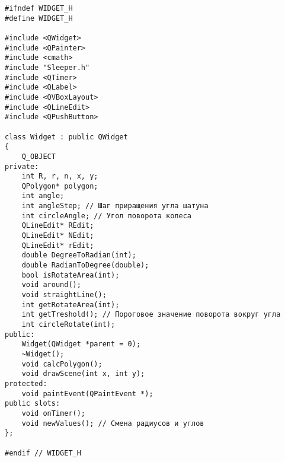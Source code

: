
\begin{lstlisting}[style=customoz, caption=widget.h]
#ifndef WIDGET_H
#define WIDGET_H

#include <QWidget>
#include <QPainter>
#include <cmath>
#include "Sleeper.h"
#include <QTimer>
#include <QLabel>
#include <QVBoxLayout>
#include <QLineEdit>
#include <QPushButton>

class Widget : public QWidget
{
    Q_OBJECT
private:
    int R, r, n, x, y;
    QPolygon* polygon;
    int angle;
    int angleStep; // Шаг приращения угла шатуна
    int circleAngle; // Угол поворота колеса
    QLineEdit* REdit;
    QLineEdit* NEdit;
    QLineEdit* rEdit;
    double DegreeToRadian(int);
    double RadianToDegree(double);
    bool isRotateArea(int);
    void around();
    void straightLine();
    int getRotateArea(int);
    int getTreshold(); // Пороговое значение поворота вокруг угла
    int circleRotate(int);
public:
    Widget(QWidget *parent = 0);
    ~Widget();
    void calcPolygon();
    void drawScene(int x, int y);
protected:
    void paintEvent(QPaintEvent *);
public slots:
    void onTimer();
    void newValues(); // Смена радиусов и углов
};

#endif // WIDGET_H
\end{lstlisting}

